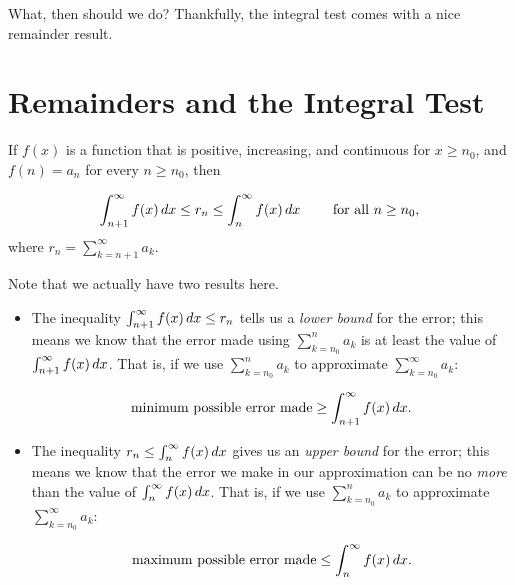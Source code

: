 \documentclass{ximera}
\begin{document}
What, then should we do?  Thankfully, the integral test comes with a nice remainder result.



\section{Remainders and the Integral Test}

\begin{theorem}
If $f(x)$ is a function that is positive, increasing, and continuous for $x \geq n_0$,  and $f(n) = a_n$ for every $n \geq n_0$, then 

\[
\int_{n+1}^{\infty} f(x) \mathop{}\!d x \leq  r_n \leq \int_{n}^{\infty} f(x) \mathop{}\!d x \qquad \textrm{ for all } n \geq n_0,
\]
where $r_n = \sum_{k=n+1}^{\infty} a_k$.
\end{theorem}

Note that we actually have two results here.

\begin{itemize}
\item The inequality $\int_{n+1}^{\infty} f(x) \mathop{}\!d x \leq  r_n$ tells us a \emph{lower bound} for the error; this means we know that the error made using $\sum_{k=n_0}^n a_k$ is at least the value of $\int_{n+1}^{\infty} f(x) \mathop{}\!d x$.  That is, if we use $\sum_{k=n_0}^n a_k$ to approximate $\sum_{k=n_0}^\infty a_k$:

\[
\textrm{minimum possible error made}  \geq \int_{n+1}^{\infty} f(x) \mathop{}\!d x.
\]

\item The inequality $r_n \leq \int_{n}^{\infty} f(x) \mathop{}\!d x$ gives us an \emph{upper bound} for the error; this means we know that the error we make in our approximation can be no \emph{more} than the value of $\int_{n}^{\infty} f(x) \mathop{}\!d x$. That is, if we use $\sum_{k=n_0}^n a_k$ to approximate $\sum_{k=n_0}^\infty a_k$:

\[
\textrm{maximum possible error made}  \leq \int_{n}^{\infty} f(x) \mathop{}\!d x.
\]
\end{itemize}








\end{document}
